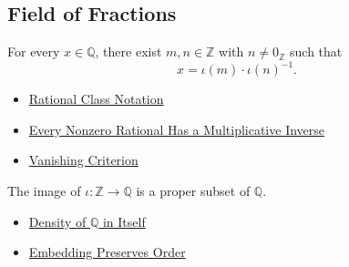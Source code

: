 \subsection*{Field of Fractions}

\begin{theorem}
\label{thm:q-is-field-of-fractions-of-z}
For every $x\in\mathbb{Q}$, there exist $m,n\in\mathbb{Z}$ with
$n\ne0_{\mathbb{Z}}$ such that
\[
x=\iota(m)\cdot \iota(n)^{-1}.
\]
\end{theorem}

\begin{dependencies}
\begin{itemize}
  \item \hyperref[def:rational-class-notation]{Rational Class Notation}
  \item \hyperref[thm:every-nonzero-rational-has-multiplicative-inverse]{Every Nonzero Rational Has a Multiplicative Inverse}
  \item \hyperref[lem:vanishing-criterion-q]{Vanishing Criterion}
\end{itemize}
\end{dependencies}

\begin{corollary}
\label{cor:embedding-z-into-q-not-surjective}
The image of $\iota:\mathbb{Z}\to\mathbb{Q}$ is a proper subset of
\(\mathbb{Q}\).
\end{corollary}

\begin{dependencies}
\begin{itemize}
  \item \hyperref[thm:density-of-q]{Density of $\mathbb{Q}$ in Itself}
  \item \hyperref[thm:embedding-z-into-q-preserves-order]{Embedding Preserves Order}
\end{itemize}
\end{dependencies}
